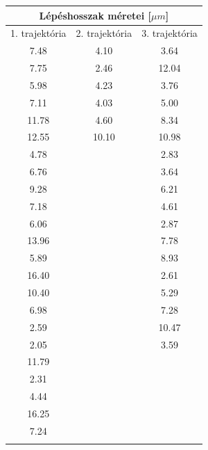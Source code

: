 \begin{multicols}{2}
\begin{tabular}{||c|c|c||}
    \toprule
    \multicolumn{3}{||c||}{Lépéshosszak méretei [$\mu m$]} \\
    \hline
    1. trajektória  & 2. trajektória  & 3. trajektória  \\ \hline \hline
    7.48            & 4.10            & 3.64            \\ \hline
    7.75            & 2.46            & 12.04           \\ \hline
    5.98            & 4.23            & 3.76            \\ \hline
    7.11            & 4.03            & 5.00            \\ \hline
    11.78           & 4.60            & 8.34            \\ \hline
    12.55           & 10.10           & 10.98           \\ \hline
    4.78            &                 & 2.83            \\ \hline
    6.76            &                 & 3.64            \\ \hline
    9.28            &                 & 6.21            \\ \hline
    7.18            &                 & 4.61            \\ \hline
    6.06            &                 & 2.87            \\ \hline
    13.96           &                 & 7.78            \\ \hline
    5.89            &                 & 8.93            \\ \hline
    16.40           &                 & 2.61            \\ \hline
    10.40           &                 & 5.29            \\ \hline
    6.98            &                 & 7.28            \\ \hline
    2.59            &                 & 10.47           \\ \hline
    2.05            &                 & 3.59            \\ \hline
    11.79           &                 &                 \\ \hline
    2.31            &                 &                 \\ \hline
    4.44            &                 &                 \\ \hline
    16.25           &                 &                 \\ \hline
    7.24            &                 &                 \\ \hline
                    &                 &                 \\
    \bottomrule
\end{tabular}
\end{multicols}

